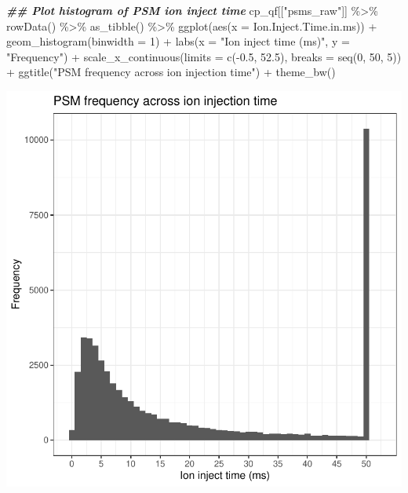 \documentclass[9pt,a4paper,]{extarticle}
\newenvironment{Shaded}{\begin{snugshade}}{\end{snugshade}}
\newcommand{\AttributeTok}[1]{\textcolor[rgb]{0.77,0.63,0.00}{#1}}
\newcommand{\DecValTok}[1]{\textcolor[rgb]{0.00,0.00,0.81}{#1}}
\newcommand{\DocumentationTok}[1]{\textcolor[rgb]{0.56,0.35,0.01}{\textbf{\textit{#1}}}}
\newcommand{\FloatTok}[1]{\textcolor[rgb]{0.00,0.00,0.81}{#1}}
\newcommand{\FunctionTok}[1]{\textcolor[rgb]{0.00,0.00,0.00}{#1}}
\newcommand{\NormalTok}[1]{#1}
\newcommand{\SpecialCharTok}[1]{\textcolor[rgb]{0.00,0.00,0.00}{#1}}
\newcommand{\StringTok}[1]{\textcolor[rgb]{0.31,0.60,0.02}{#1}}
\begin{document}
\begin{Shaded}
\begin{Highlighting}[]
\DocumentationTok{\#\# Plot histogram of PSM ion inject time}
\NormalTok{cp\_qf[[}\StringTok{"psms\_raw"}\NormalTok{]] }\SpecialCharTok{\%\textgreater{}\%}
  \FunctionTok{rowData}\NormalTok{() }\SpecialCharTok{\%\textgreater{}\%} 
  \FunctionTok{as\_tibble}\NormalTok{() }\SpecialCharTok{\%\textgreater{}\%}
  \FunctionTok{ggplot}\NormalTok{(}\FunctionTok{aes}\NormalTok{(}\AttributeTok{x =}\NormalTok{ Ion.Inject.Time.in.ms)) }\SpecialCharTok{+}
  \FunctionTok{geom\_histogram}\NormalTok{(}\AttributeTok{binwidth =} \DecValTok{1}\NormalTok{) }\SpecialCharTok{+}
  \FunctionTok{labs}\NormalTok{(}\AttributeTok{x =} \StringTok{"Ion inject time (ms)"}\NormalTok{, }\AttributeTok{y =} \StringTok{"Frequency"}\NormalTok{) }\SpecialCharTok{+}
  \FunctionTok{scale\_x\_continuous}\NormalTok{(}\AttributeTok{limits =} \FunctionTok{c}\NormalTok{(}\SpecialCharTok{{-}}\FloatTok{0.5}\NormalTok{, }\FloatTok{52.5}\NormalTok{), }\AttributeTok{breaks =} \FunctionTok{seq}\NormalTok{(}\DecValTok{0}\NormalTok{, }\DecValTok{50}\NormalTok{, }\DecValTok{5}\NormalTok{)) }\SpecialCharTok{+}
  \FunctionTok{ggtitle}\NormalTok{(}\StringTok{"PSM frequency across ion injection time"}\NormalTok{) }\SpecialCharTok{+}
  \FunctionTok{theme\_bw}\NormalTok{()}
\end{Highlighting}
\end{Shaded}

\begin{center}\includegraphics[height=0.3\textheight]{workflow_expressions_files/figure-latex/tmt_ion_injection_2-1} \end{center}
\end{document}
